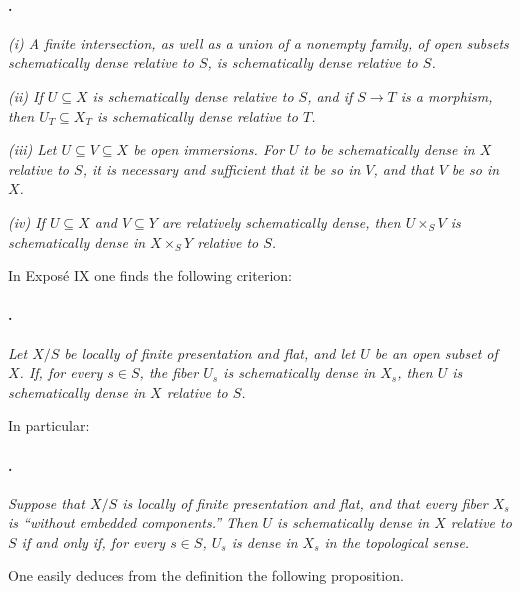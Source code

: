 \paragraph{.}
\textit{(i) A finite intersection, as well as a union of a nonempty
family, of open subsets schematically dense relative to \(S\), is
schematically dense relative to \(S\).}

\textit{(ii) If \(U\subseteq X\) is schematically dense relative to
\(S\), and if \(S\to T\) is a morphism, then
\(U_T\subseteq X_T\) is schematically dense relative to \(T\).}

\textit{(iii) Let \(U\subseteq V\subseteq X\) be open immersions. For
\(U\) to be schematically dense in \(X\) relative to \(S\), it is
necessary and sufficient that it be so in \(V\), and that \(V\) be so
in \(X\).}

\textit{(iv) If \(U\subseteq X\) and \(V\subseteq Y\) are relatively
schematically dense, then \(U\times_S V\) is schematically dense in
\(X\times_S Y\) relative to \(S\).}

In Exposé IX one finds the following criterion:

\paragraph{.}
\textit{Let \(X/S\) be locally of finite presentation and flat, and
let \(U\) be an open subset of \(X\). If, for every \(s\in S\), the
fiber \(U_s\) is schematically dense in \(X_s\), then \(U\) is
schematically dense in \(X\) relative to \(S\).}

In particular:

\paragraph{.}
\textit{Suppose that \(X/S\) is locally of finite presentation and
flat, and that every fiber \(X_s\) is ``without embedded
components.'' Then \(U\) is schematically dense in \(X\) relative to
\(S\) if and only if, for every \(s\in S\), \(U_s\) is dense in
\(X_s\) in the topological sense.}

One easily deduces from the definition the following proposition.


